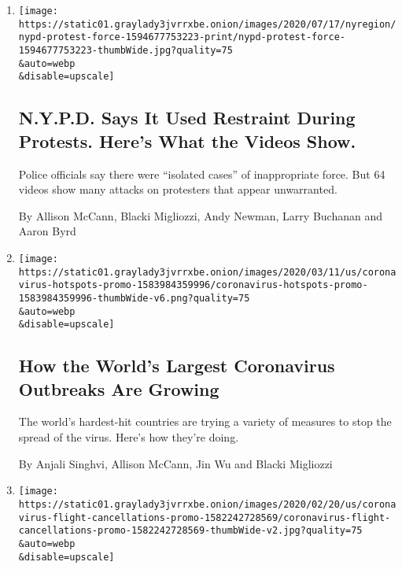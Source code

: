 \begin{enumerate}
\def\labelenumi{\arabic{enumi}.}
\item
  \href{/interactive/2020/07/14/nyregion/nypd-george-floyd-protests.html}{}

  \texttt{[image: https://static01.graylady3jvrrxbe.onion/images/2020/07/17/nyregion/nypd-protest-force-1594677753223-print/nypd-protest-force-1594677753223-thumbWide.jpg?quality=75\\\&auto=webp\\\&disable=upscale]}

  \hypertarget{nypd-says-it-used-restraint-during-protests-heres-what-the-videos-show}{%
  \subsection{N.Y.P.D. Says It Used Restraint During Protests. Here's
  What the Videos
  Show.}\label{nypd-says-it-used-restraint-during-protests-heres-what-the-videos-show}}

  Police officials say there were ``isolated cases'' of inappropriate
  force. But 64 videos show many attacks on protesters that appear
  unwarranted.

  By Allison McCann, Blacki Migliozzi, Andy Newman, Larry Buchanan and
  Aaron Byrd
\item
  \href{/interactive/2020/world/coronavirus-maps-italy-iran-korea.html}{}

  \texttt{[image: https://static01.graylady3jvrrxbe.onion/images/2020/03/11/us/coronavirus-hotspots-promo-1583984359996/coronavirus-hotspots-promo-1583984359996-thumbWide-v6.png?quality=75\\\&auto=webp\\\&disable=upscale]}

  \hypertarget{how-the-worlds-largest-coronavirus-outbreaks-are-growing}{%
  \subsection{How the World's Largest Coronavirus Outbreaks Are
  Growing}\label{how-the-worlds-largest-coronavirus-outbreaks-are-growing}}

  The world's hardest-hit countries are trying a variety of measures to
  stop the spread of the virus. Here's how they're doing.

  By Anjali Singhvi, Allison McCann, Jin Wu and Blacki Migliozzi
\item
  \href{/interactive/2020/02/21/business/coronavirus-airline-travel.html}{}

  \texttt{[image: https://static01.graylady3jvrrxbe.onion/images/2020/02/20/us/coronavirus-flight-cancellations-promo-1582242728569/coronavirus-flight-cancellations-promo-1582242728569-thumbWide-v2.jpg?quality=75\\\&auto=webp\\\&disable=upscale]}


\end{enumerate}
